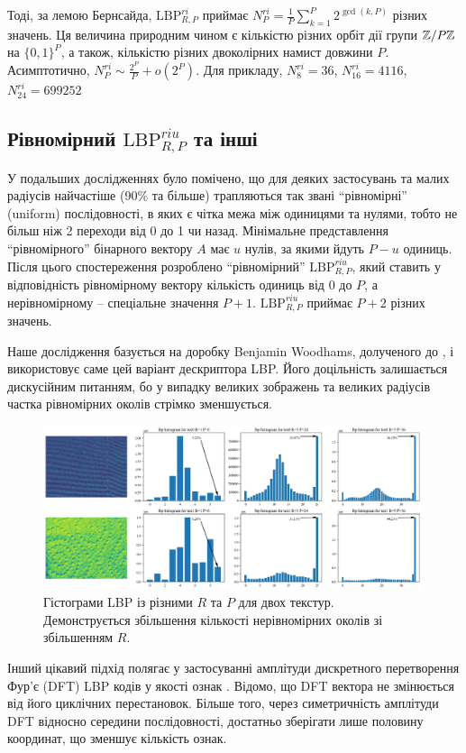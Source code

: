 Тоді, за лемою Бернсайда, $\mathrm{LBP}^{ri}_{R,P}$ приймає $N^{ri}_P = \frac{1}{P}\sum_{k=1}^P 2^{\operatorname{gcd}(k,P)}$ різних значень. 
Ця величина природним чином є кількістю різних орбіт дії групи $\mathbb Z/P\mathbb Z$ на $\{0,1\}^P$, а також, кількістю різних двоколірних намист довжини $P$.
Асимптотично, $N^{ri}_P \sim \frac{2^P}{P} + o(2^P)$. 
Для прикладу, $N^{ri}_8 = 36$, $N^{ri}_{16} = 4116$, $N^{ri}_{24} = 699252$

\subsection{Рівномірний \(\mathrm{LBP}_{R,P}^{riu}\) та інші}\label{section1.1d}\hfill

У подальших дослідженнях \cite{ojala2002} було помічено, що для деяких застосувань та малих радіусів найчастіше (90\% та більше) 
трапляються так звані ``рівномірні'' (uniform) послідовності, в яких є чітка межа між одиницями та нулями, 
тобто не більш ніж 2 переходи від 0 до 1 чи назад. 
Мінімальне представлення ``рівномірного'' бінарного вектору $A$ має $u$ нулів, за якими йдуть $P-u$ одиниць.
Після цього спостереження розроблено ``рівномірний'' $\mathrm{LBP}^{riu}_{R,P}$, 
який ставить у відповідність рівномірному вектору кількість одиниць від $0$ до $P$, а нерівномірному -- спеціальне значення $P+1$.
$\mathrm{LBP}^{riu}_{R,P}$ приймає $P+2$ різних значень.

Наше дослідження \cite{fastlbp2024} базується на доробку Benjamin Woodhams, долученого до \cite{lee2025integrated}, і використовує саме цей варіант дескриптора LBP.
Його доцільність залишається дискусійним питанням, бо у випадку великих зображень та великих радіусів 
частка рівномірних околів стрімко зменшується.

\begin{figure}[h]
    \centering
    \includegraphics[width=0.99\textwidth]{img/cloth-hist-lbpu.jpg}
    \caption{
        Гістограми LBP із різними $R$ та $P$ для двох текстур.
        Демонструється збільшення кількості нерівномірних околів зі збільшенням $R$.
    }
    \label{fig:cloth-hist-lbpu}
\end{figure}

Інший цікавий підхід полягає у застосуванні амплітуди дискретного перетворення Фур'є (DFT) LBP кодів у якості ознак \cite{arof1998, haley1999}.
Відомо, що DFT вектора не змінюється від його циклічних перестановок. 
Більше того, через симетричність амплітуди DFT відносно середини послідовності, достатньо зберігати лише половину координат, що зменшує кількість ознак. 

